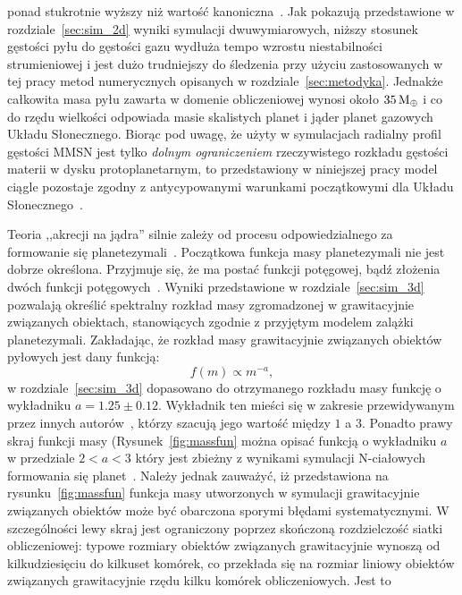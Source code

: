ponad stukrotnie wyższy niż wartość kanoniczna~\cite{FS03}. Jak pokazują
przedstawione w rozdziale~\ref{sec:sim_2d} wyniki symulacji dwuwymiarowych,
niższy stosunek gęstości pyłu do gęstości gazu wydłuża tempo wzrostu
niestabilności strumieniowej i jest dużo trudniejszy do śledzenia przy użyciu
zastosowanych w tej pracy metod numerycznych opisanych w
rozdziale~\ref{sec:metodyka}. Jednakże całkowita masa pyłu zawarta w domenie
obliczeniowej wynosi około $35\hbox{$\mathrm{\thinspace M_{\oplus}}$}$ i co do rzędu wielkości odpowiada masie
skalistych planet i jąder planet gazowych Układu Słonecznego. Biorąc pod uwagę,
że użyty w symulacjach radialny profil gęstości MMSN jest tylko \emph{dolnym
ograniczeniem} rzeczywistego rozkładu gęstości materii w dysku protoplanetarnym,
to przedstawiony w niniejszej pracy model ciągle pozostaje
zgodny z antycypowanymi warunkami początkowymi dla Układu Słonecznego~\cite{D07}.
\par Teoria ,,akrecji na jądra'' silnie zależy od procesu odpowiedzialnego za
formowanie się planetezymali~\cite{HBP13}. Początkowa funkcja masy planetezymali
nie jest dobrze określona. Przyjmuje się, że ma postać funkcji potęgowej, bądź
złożenia dwóch funkcji potęgowych~\cite{R03}. Wyniki przedstawione w
rozdziale~\ref{sec:sim_3d} pozwalają określić spektralny rozkład masy zgromadzonej w
grawitacyjnie związanych obiektach, stanowiących zgodnie z przyjętym modelem
zalążki planetezymali.  Zakładając, że rozkład masy grawitacyjnie związanych
obiektów pyłowych jest dany funkcją:
%
\begin{equation}
   f(m) \propto m^{-a},
\end{equation}
%
w rozdziale~\ref{sec:sim_3d} dopasowano do otrzymanego rozkładu masy funkcję o
wykładniku $a = 1.25\pm0.12$. Wykładnik ten mieści się w zakresie przewidywanym
przez innych
autorów~\cite{R03}, którzy szacują jego wartość między $1$ a $3$. Ponadto prawy
skraj funkcji masy (Rysunek~\ref{fig:massfun} można opisać funkcją o wykładniku
$a$ w przedziale $2 < a < 3$ który jest zbieżny z wynikami symulacji N-ciałowych
formowania się planet~\cite{MFFK98}.  Należy jednak zauważyć, iż przedstawiona
na rysunku~\ref{fig:massfun} funkcja masy utworzonych w symulacji grawitacyjnie
związanych obiektów może być obarczona sporymi błędami systematycznymi.
W szczególności lewy skraj jest ograniczony poprzez skończoną rozdzielczość
siatki obliczeniowej: typowe rozmiary obiektów związanych grawitacyjnie wynoszą
od kilkudziesięciu do kilkuset komórek, co przekłada się na rozmiar liniowy
obiektów związanych grawitacyjnie rzędu kilku komórek obliczeniowych. Jest to
